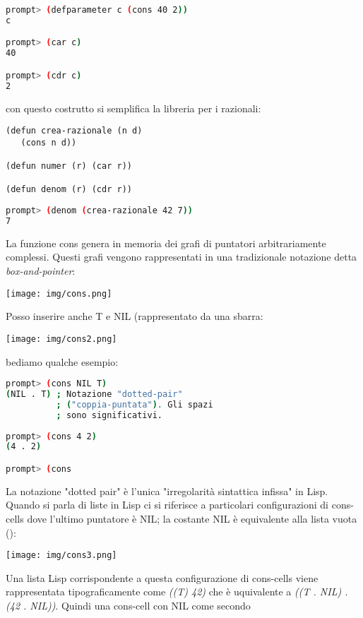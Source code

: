 \documentclass[a4paper,12pt, oneside]{book}
\begin{document}
\begin{shaded}
\begin{lstlisting}[language=bash]
prompt> (defparameter c (cons 40 2))
c

prompt> (car c)
40

prompt> (cdr c)
2
\end{lstlisting}
\end{shaded}
con questo costrutto si semplifica la libreria per i razionali:
\begin{verbatim}
(defun crea-razionale (n d)
   (cons n d))

(defun numer (r) (car r))

(defun denom (r) (cdr r))
\end{verbatim}
\begin{shaded}
\begin{lstlisting}[language=bash]
prompt> (denom (crea-razionale 42 7))
7
\end{lstlisting}
\end{shaded}
La funzione cons genera in memoria dei grafi di puntatori
arbitrariamente complessi. Questi grafi vengono rappresentati in una tradizionale notazione detta \textit{box-and-pointer}:
\begin{center}
\texttt{[image: img/cons.png]}
\end{center}
Posso inserire anche T e NIL (rappresentato da una sbarra:
\begin{center}
\texttt{[image: img/cons2.png]}
\end{center}
bediamo qualche esempio:
\begin{shaded}
\begin{lstlisting}[language=bash]
prompt> (cons NIL T)
(NIL . T) ; Notazione "dotted-pair"
          ; ("coppia-puntata"). Gli spazi
          ; sono significativi.
          
prompt> (cons 4 2)
(4 . 2)

prompt> (cons
\end{lstlisting}
\end{shaded}
La notazione "dotted pair" è l'unica "irregolarità sintattica infissa" in Lisp.		
\\
Quando si parla di liste in Lisp ci si riferisce a particolari configurazioni di cons-cells dove l'ultimo puntatore è NIL; la costante NIL è equivalente alla lista vuota ():
\begin{center}
\texttt{[image: img/cons3.png]}
\end{center}
Una lista Lisp corrispondente a questa configurazione di cons-cells viene rappresentata tipograficamente come \textit{((T) 42)} che è uquivalente a \textit{((T . NIL) . (42 . NIL))}. Quindi una cons-cell con NIL come secondo
\end{document}
